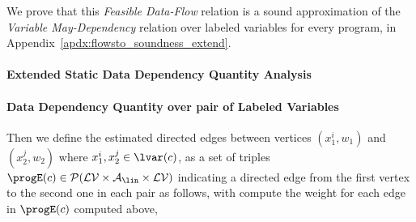 %
We prove that this \emph{Feasible Data-Flow} relation is a sound approximation 
of the \emph{Variable May-Dependency} relation over labeled variables for every program,
in Appendix~\ref{apdx:flowsto_soundness_extend}.
%
\paragraph{Extended Static Data Dependency Quantity Analysis}
\label{sec:refine-static-reachability}
\paragraph*{Data Dependency Quantity over pair of Labeled Variables }
Then we define the estimated directed edges
between vertices $({x}_1^{i}, w_1)$  
and $({x}_2^{j}, w_2)$ 
where ${x}_1^{i}, {x}_2^{j} \in \lvar(c)$,
as a set of triples 
$\progE(c) \in \mathcal{P}(\mathcal{LV} \times \mathcal{A}_{\lin} \times \mathcal{LV})$
indicating a directed edge from the first vertex to the second one in each pair
as follows,
with compute the weight for each edge in $\progE(c)$ computed above,
\highlight{
 \[
   \progE(c) \triangleq
   \left\{ (x^i, w, y^j) 
\mid
(x^i, w, y^j) \in \progE^0(c) \land 
w = \max \left\{ \absclr(\absevent) ~\mid~ \absevent \in \absflow(c) \land \absevent = (i, \_, j) \right\} 
\right\}.
\]
}

